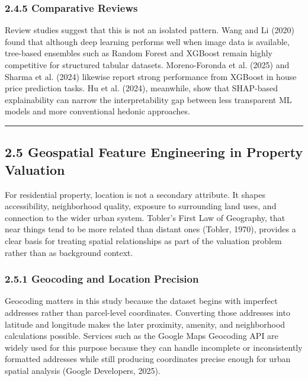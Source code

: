 \subsubsection{\texorpdfstring{\textbf{2.4.5 Comparative Reviews}}{2.4.5 Comparative Reviews}}\label{comparative-reviews}

Review studies suggest that this is not an isolated pattern. Wang and Li (2020) found that although deep learning performs well when image data is available, tree-based ensembles such as Random Forest and XGBoost remain highly competitive for structured tabular datasets. Moreno-Foronda et al. (2025) and Sharma et al. (2024) likewise report strong performance from XGBoost in house price prediction tasks. Hu et al. (2024), meanwhile, show that SHAP-based explainability can narrow the interpretability gap between less transparent ML models and more conventional hedonic approaches.

\begin{center}\rule{0.5\linewidth}{0.5pt}\end{center}

\subsection{\texorpdfstring{\textbf{2.5 Geospatial Feature Engineering in Property Valuation}}{2.5 Geospatial Feature Engineering in Property Valuation}}\label{geospatial-feature-engineering-in-property-valuation}

For residential property, location is not a secondary attribute. It shapes accessibility, neighborhood quality, exposure to surrounding land uses, and connection to the wider urban system. Tobler's First Law of Geography, that near things tend to be more related than distant ones (Tobler, 1970), provides a clear basis for treating spatial relationships as part of the valuation problem rather than as background context.

\subsubsection{\texorpdfstring{\textbf{2.5.1 Geocoding and Location Precision}}{2.5.1 Geocoding and Location Precision}}\label{geocoding-and-location-precision}

Geocoding matters in this study because the dataset begins with imperfect addresses rather than parcel-level coordinates. Converting those addresses into latitude and longitude makes the later proximity, amenity, and neighborhood calculations possible. Services such as the Google Maps Geocoding API are widely used for this purpose because they can handle incomplete or inconsistently formatted addresses while still producing coordinates precise enough for urban spatial analysis (Google Developers, 2025).

